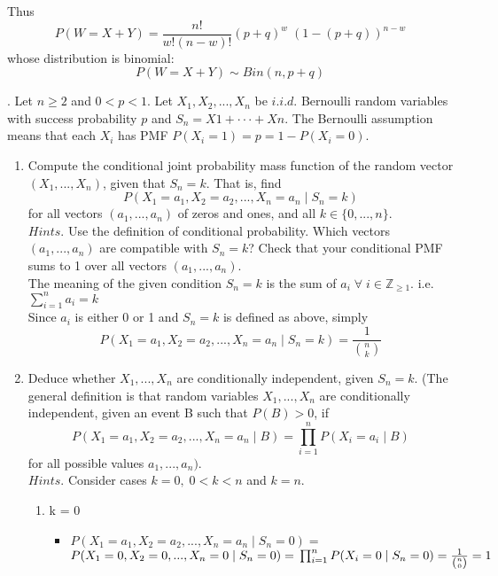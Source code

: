 \documentclass[12pt]{article}
\newcommand{\Z}{\mathbb{Z}}
\begin{document}
\noindent
Thus $$P(W= X + Y) = \frac{n!}{w!(n-w)!} (p + q)^w \; (1-(p+q))^{n-w}$$ 
whose distribution is binomial:  $$P(W = X + Y) \sim Bin(n, p+q)$$

\newpage
{}. Let $n \ge 2$ and $0 < p < 1$. Let $X_1,X_2, . . . ,X_n$ be $i.i.d.$ Bernoulli random variables with success probability $p$ and $S_n = X1 + · · · + Xn$. The Bernoulli assumption means that each $X_i$ has PMF $P(X_i = 1) = p = 1 - P(X_i = 0)$.

\begin{enumerate}[label=(\alph*)]
    \item Compute the conditional joint probability mass function of the random vector
    $(X_1, . . . ,X_n)$, given that $S_n = k$. That is, find $$P(X_1 = a_1, X_2 = a_2, ..., X_n = a_n\;|\;S_n = k)$$ for all vectors $(a_1,...,a_n)$ of zeros and ones, and all $k \in \{0,...,n\}$.\\
    $Hints.$ Use the definition of conditional probability. Which vectors $(a_1, . . . , a_n)$ are compatible with $S_n = k$? Check that your conditional PMF sums to 1 over all vectors $(a_1, . . . , a_n).$\\
    
The meaning of the given condition $S_n = k$ is the sum of $a_i \;\forall\; i \in \Z_{\ge 1}.$
i.e. $\sum_{i=1}^n a_i = k$  \\

Since $a_i$ is either 0 or 1 and $S_n=k$ is defined as above, simply
$$P(X_1 = a_1, X_2 = a_2, ..., X_n = a_n\;|\;S_n = k) = \frac{1}{\binom nk}$$


\newpage
    \item Deduce whether $X_1, . . . ,X_n$ are conditionally independent, given $S_n = k$. (The general definition is that random variables $X_1, . . . ,X_n$ are conditionally independent, given an event B such that $P(B) > 0$, if $$P(X_1 = a_1, X_2 = a_2,...,X_n=a_n\;|\;B) = \prod_{i=1}^n P(X_i = a_i\;|\;B)$$ for all possible values $a_1,...,a_n).$\\
    $Hints.$ Consider cases $k = 0,\; 0 < k < n$ and $k = n$.
    
    \begin{enumerate}[label=(\roman*)]
       \item k = 0
        
            \begin{itemize}
                \item $P(X_1 = a_1, X_2 = a_2,...,X_n=a_n\;|\;S_n=0)=$\\
                $P(X_1 = 0, X_2 = 0,...,X_n=0\;|\;S_n=0) =\\ 
                \prod_{i=1}^n P(X_i = 0\;|\;S_n=0) = \frac{1}{\binom n0} = 1$
            \end{itemize}
            

\end{enumerate}
\end{enumerate}
\end{document}

